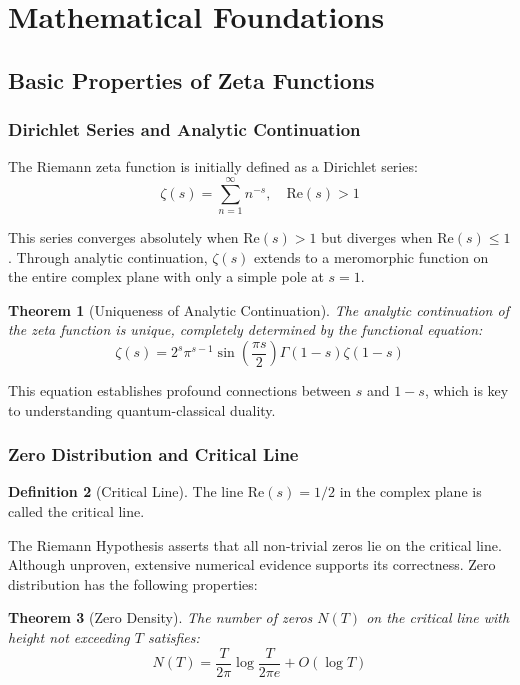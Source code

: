 \documentclass[11pt]{article}
\theoremstyle{plain}
\newtheorem{theorem}{Theorem}[section]
\theoremstyle{definition}
\newtheorem{definition}[theorem]{Definition}
\theoremstyle{remark}
\begin{document}
\section{Mathematical Foundations}

\subsection{Basic Properties of Zeta Functions}

\subsubsection{Dirichlet Series and Analytic Continuation}

The Riemann zeta function is initially defined as a Dirichlet series:
$$\zeta(s) = \sum_{n=1}^{\infty} n^{-s}, \quad \text{Re}(s) > 1$$

This series converges absolutely when $\text{Re}(s) > 1$ but diverges when $\text{Re}(s) \leq 1$. Through analytic continuation, $\zeta(s)$ extends to a meromorphic function on the entire complex plane with only a simple pole at $s = 1$.

\begin{theorem}[Uniqueness of Analytic Continuation]
The analytic continuation of the zeta function is unique, completely determined by the functional equation:
$$\zeta(s) = 2^s \pi^{s-1} \sin\left(\frac{\pi s}{2}\right) \Gamma(1-s) \zeta(1-s)$$
\end{theorem}

This equation establishes profound connections between $s$ and $1-s$, which is key to understanding quantum-classical duality.

\subsubsection{Zero Distribution and Critical Line}

\begin{definition}[Critical Line]
The line $\text{Re}(s) = 1/2$ in the complex plane is called the critical line.
\end{definition}

The Riemann Hypothesis asserts that all non-trivial zeros lie on the critical line. Although unproven, extensive numerical evidence supports its correctness. Zero distribution has the following properties:

\begin{theorem}[Zero Density]
The number of zeros $N(T)$ on the critical line with height not exceeding $T$ satisfies:
$$N(T) = \frac{T}{2\pi} \log\frac{T}{2\pi e} + O(\log T)$$
\end{theorem}
\end{document}
